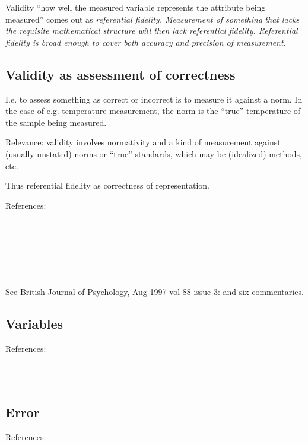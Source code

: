 \documentclass[11pt,twoside]{article}
\begin{document}
Validity ``how well the measured variable represents the attribute
being measured'' comes out as \it{referential fidelity}.  Measurement
of something that lacks the requisite mathematical structure will then
lack referential fidelity.  Referential fidelity is broad enough to
cover both accuracy and precision of measurement.

\subsection{Validity as assessment of correctness}

I.e. to assess something as correct or incorrect is to measure it
against a norm.  In the case of e.g. temperature measurement, the norm
is the ``true'' temperature of the sample being measured.

Relevance: validity involves normativity and a kind of measurement
against (usually unstated) norms or ``true'' standards, which may be
(idealized) methods, etc.

Thus referential fidelity as correctness of representation.

\noindent References:

\noindent
\cite{chang_inventing_2004} \\
\cite{chang_measurement_2004} \\
\cite{chang_spirit_2004} \\
\cite{martin_counting_2009} \\
\cite{michell_normal_2000}\\
\cite{sherry_thermoscopes_2011}

See British Journal of Psychology, Aug 1997 vol 88 issue 3:
\cite{michell_quantitative_1997} and six commentaries.

\subsection{Variables}

References:

\noindent
\cite{schwarz_is_2009}\\
\cite{toomela_variables_2008}\\
\cite{stam_fault_2010}

\subsection{Error}

References:
\end{document}
